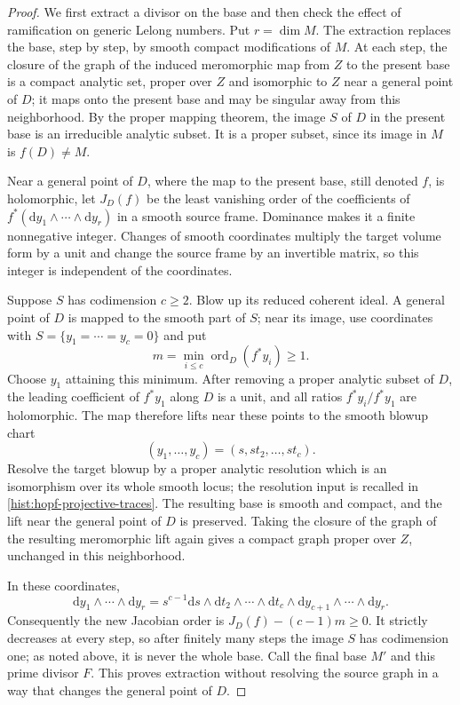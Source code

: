 \begin{proof}
We first extract a divisor on the base and then check the effect of ramification on generic Lelong numbers. Put $r=\dim M$. The extraction replaces the base, step by step, by smooth compact modifications of $M$. At each step, the closure of the graph of the induced meromorphic map from $Z$ to the present base is a compact analytic set, proper over $Z$ and isomorphic to $Z$ near a general point of $D$; it maps onto the present base and may be singular away from this neighborhood. By the proper mapping theorem, the image $S$ of $D$ in the present base is an irreducible analytic subset. It is a proper subset, since its image in $M$ is $f(D)\neq M$.

Near a general point of $D$, where the map to the present base, still denoted $f$, is holomorphic, let $J_D(f)$ be the least vanishing order of the coefficients of $f^*(\mathrm dy_1\wedge\cdots\wedge\mathrm dy_r)$ in a smooth source frame. Dominance makes it a finite nonnegative integer. Changes of smooth coordinates multiply the target volume form by a unit and change the source frame by an invertible matrix, so this integer is independent of the coordinates.

Suppose $S$ has codimension $c\geq2$. Blow up its reduced coherent ideal. A general point of $D$ is mapped to the smooth part of $S$; near its image, use coordinates with $S=\{y_1=\cdots=y_c=0\}$ and put
\[
 m=\min_{i\leq c}\operatorname{ord}_D(f^*y_i)\geq1.
\]
Choose $y_1$ attaining this minimum. After removing a proper analytic subset of $D$, the leading coefficient of $f^*y_1$ along $D$ is a unit, and all ratios $f^*y_i/f^*y_1$ are holomorphic. The map therefore lifts near these points to the smooth blowup chart
\[
 (y_1,\ldots,y_c)=(s,st_2,\ldots,st_c).
\]
Resolve the target blowup by a proper analytic resolution which is an isomorphism over its whole smooth locus; the resolution input is recalled in \cref{hist:hopf-projective-traces}. The resulting base is smooth and compact, and the lift near the general point of $D$ is preserved. Taking the closure of the graph of the resulting meromorphic lift again gives a compact graph proper over $Z$, unchanged in this neighborhood.

In these coordinates,
\[
 \mathrm dy_1\wedge\cdots\wedge\mathrm dy_r
 =s^{c-1}\mathrm ds\wedge\mathrm dt_2\wedge\cdots\wedge\mathrm dt_c
                  \wedge\mathrm dy_{c+1}\wedge\cdots\wedge\mathrm dy_r.
\]
Consequently the new Jacobian order is $J_D(f)-(c-1)m\geq0$. It strictly decreases at every step, so after finitely many steps the image $S$ has codimension one; as noted above, it is never the whole base. Call the final base $M'$ and this prime divisor $F$. This proves extraction without resolving the source graph in a way that changes the general point of $D$.


\end{proof}
